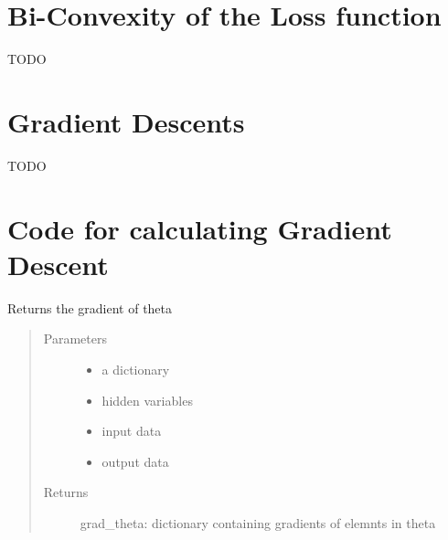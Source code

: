 \documentclass[letterpaper,10pt,english]{sphinxmanual}
\begin{document}
\section{Bi-Convexity of the Loss function}
\label{\detokenize{sections/gradient_descents:bi-convexity-of-the-loss-function}}
TODO


\section{Gradient Descents}
\label{\detokenize{sections/gradient_descents:id4}}
TODO


\section{Code for calculating Gradient Descent}
\label{\detokenize{sections/gradient_descents:code-for-calculating-gradient-descent}}\label{\detokenize{sections/gradient_descents:module-utilities.GradientDescents}}

\begin{fulllineitems}
\label{\detokenize{sections/gradient_descents:utilities.GradientDescents.gradient_descent_theta}}
Returns the gradient of theta
\begin{quote}\begin{description}
\item[{Parameters}] \leavevmode\begin{itemize}
\item {} 
 \textendash{} a dictionary

\item {} 
 \textendash{} hidden variables

\item {} 
 \textendash{} input data

\item {} 
 \textendash{} output data

\end{itemize}

\item[{Returns}] \leavevmode
grad\_theta: dictionary containing gradients of elemnts in theta

\end{description}\end{quote}

\end{fulllineitems}
\end{document}
